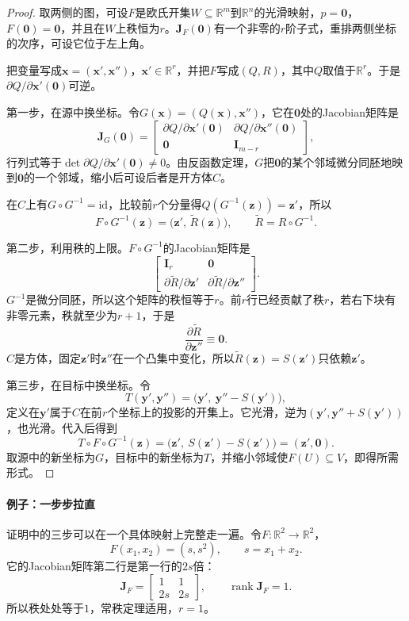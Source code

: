 \begin{proof}
取两侧的图，可设$F$是欧氏开集$W\subseteq\mathbb R^m$到$\mathbb R^n$的光滑映射，$p=\bm 0$，$F(\bm 0)=\bm 0$，并且在$W$上秩恒为$r$。$\bm J_F(\bm 0)$有一个非零的$r$阶子式，重排两侧坐标的次序，可设它位于左上角。

把变量写成$\bm x=(\bm x',\bm x'')$，$\bm x'\in\mathbb R^r$，并把$F$写成$(Q,R)$，其中$Q$取值于$\mathbb R^r$。于是$\partial Q/\partial\bm x'(\bm 0)$可逆。

第一步，在源中换坐标。令$G(\bm x)=(Q(\bm x),\bm x'')$，它在$\bm 0$处的Jacobian矩阵是
\[
\bm J_G(\bm 0)=\begin{bmatrix}\partial Q/\partial\bm x'(\bm 0)&\partial Q/\partial\bm x''(\bm 0)\\\bm 0&\bm I_{m-r}\end{bmatrix},
\]
行列式等于$\det\partial Q/\partial\bm x'(\bm 0)\neq0$。由反函数定理，$G$把$\bm 0$的某个邻域微分同胚地映到$\bm 0$的一个邻域，缩小后可设后者是开方体$C$。

在$C$上有$G\circ G^{-1}=\mathrm{id}$，比较前$r$个分量得$Q(G^{-1}(\bm z))=\bm z'$，所以
\[
F\circ G^{-1}(\bm z)=\bigl(\bm z',\,\widetilde R(\bm z)\bigr),\qquad \widetilde R=R\circ G^{-1}.
\]

第二步，利用秩的上限。$F\circ G^{-1}$的Jacobian矩阵是
\[
\begin{bmatrix}\bm I_r&\bm 0\\\partial\widetilde R/\partial\bm z'&\partial\widetilde R/\partial\bm z''\end{bmatrix}.
\]
$G^{-1}$是微分同胚，所以这个矩阵的秩恒等于$r$。前$r$行已经贡献了秩$r$，若右下块有非零元素，秩就至少为$r+1$，于是
\[
\frac{\partial\widetilde R}{\partial\bm z''}\equiv\bm 0.
\]
$C$是方体，固定$\bm z'$时$\bm z''$在一个凸集中变化，所以$\widetilde R(\bm z)=S(\bm z')$只依赖$\bm z'$。

第三步，在目标中换坐标。令
\[
T(\bm y',\bm y'')=\bigl(\bm y',\ \bm y''-S(\bm y')\bigr),
\]
定义在$\bm y'$属于$C$在前$r$个坐标上的投影的开集上。它光滑，逆为$(\bm y',\bm y''+S(\bm y'))$，也光滑。代入后得到
\[
T\circ F\circ G^{-1}(\bm z)=\bigl(\bm z',\ S(\bm z')-S(\bm z')\bigr)=(\bm z',\bm 0).
\]
取源中的新坐标为$G$，目标中的新坐标为$T$，并缩小邻域使$F(U)\subseteq V$，即得所需形式。
\end{proof}

\paragraph{例子：一步步拉直}
证明中的三步可以在一个具体映射上完整走一遍。令$F:\mathbb R^2\to\mathbb R^2$，
\[
F(x_1,x_2)=(s,s^2),\qquad s=x_1+x_2.
\]
它的Jacobian矩阵第二行是第一行的$2s$倍：
\[
\bm J_F=\begin{bmatrix}1&1\\2s&2s\end{bmatrix},\qquad\operatorname{rank}\bm J_F=1.
\]
所以秩处处等于$1$，常秩定理适用，$r=1$。

